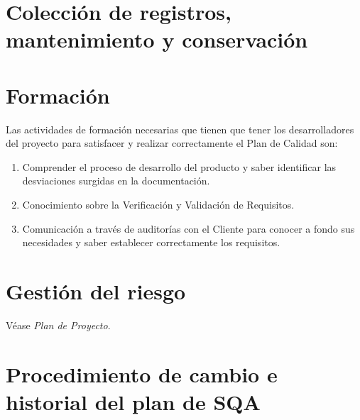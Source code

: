 \documentclass[11pt, a4paper, twoside, titlepage]{article}
\begin{document}
	\section{Colección de registros, mantenimiento y conservación}%





	\section{Formación}%
	Las actividades de formación necesarias que tienen que tener los desarrolladores del proyecto  para satisfacer
		y realizar correctamente el Plan de Calidad son:
		\begin{enumerate}
			\item Comprender el proceso de desarrollo del producto y saber identificar las desviaciones surgidas en la documentación.
			\item Conocimiento sobre la Verificación y Validación de Requisitos.
			\item Comunicación a través de auditorías con el Cliente para conocer a fondo sus necesidades y saber establecer correctamente
			los requisitos.
		\end{enumerate}
		
	\section{Gestión del riesgo}
		Véase \textit{Plan de Proyecto}.
		\printglossaries
	\section{Procedimiento de cambio e historial del plan de SQA}%


	\newpage
	
	
\end{document}
